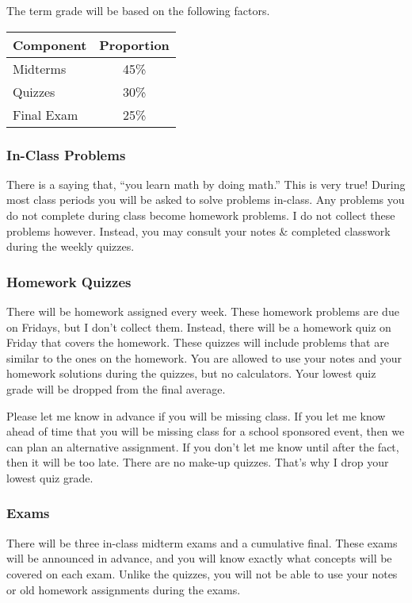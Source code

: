 \documentclass[10pt]{article}
\begin{document}
The term grade will be based on the following factors.

\begin{center}
\begin{tabular}{|l|c|}
\hline
Component      & Proportion    \\ \hline
Midterms  & 45\% \\ 
Quizzes  & 30\% \\ 
Final Exam  & 25\% \\ \hline
\end{tabular}
\end{center}


\subsubsection*{In-Class Problems}

There is a saying that, “you learn math by doing math.” This is very true! During most class periods you will be asked to solve problems in-class. Any problems you do not complete during class become homework problems. I do not collect these problems however. Instead, you may consult your notes \& completed classwork during the weekly quizzes.


\subsubsection*{Homework Quizzes}

There will be homework assigned every week. These homework problems are due on Fridays, but I don’t collect them. Instead, there will be a homework quiz on Friday that covers the homework. These quizzes will include problems that are similar to the ones on the homework. You are allowed to use your notes and your homework solutions during the quizzes, but no calculators. Your lowest quiz grade will be dropped from the final average.

Please let me know in advance if you will be missing class. If you let me know ahead of time that you will be missing class for a school sponsored event, then we can plan an alternative assignment. If you don’t let me know until after the fact, then it will be too late. There are no make-up quizzes. That’s why I drop your lowest quiz grade.

\subsubsection*{Exams}

There will be three in-class midterm exams and a cumulative final. These exams will be announced in advance, and you will know exactly what concepts will be covered on each exam. Unlike the quizzes, you will not be able to use your notes or old homework assignments during the exams.
\end{document}
